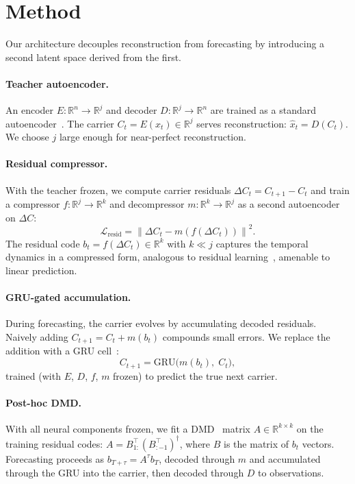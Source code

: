 \documentclass{article}
\begin{document}
\section{Method}
\label{sec:method}

Our architecture decouples reconstruction from forecasting by introducing a
second latent space derived from the first.

\paragraph{Teacher autoencoder.}
An encoder $E: \mathbb{R}^n \to \mathbb{R}^j$ and decoder
$D: \mathbb{R}^j \to \mathbb{R}^n$ are trained as a standard
autoencoder~\citep{hinton2006reducing}.
The carrier $C_t = E(x_t) \in \mathbb{R}^j$ serves reconstruction:
$\hat{x}_t = D(C_t)$.  We choose $j$ large enough for near-perfect
reconstruction.

\paragraph{Residual compressor.}
With the teacher frozen, we compute carrier residuals
$\Delta C_t = C_{t+1} - C_t$ and train a compressor $f: \mathbb{R}^j \to
\mathbb{R}^k$ and decompressor $m: \mathbb{R}^k \to \mathbb{R}^j$ as a
second autoencoder on $\Delta C$:
\begin{equation}
  \mathcal{L}_{\mathrm{resid}} = \left\| \Delta C_t - m(f(\Delta C_t)) \right\|^2.
  \label{eq:resid}
\end{equation}
The residual code $b_t = f(\Delta C_t) \in \mathbb{R}^k$ with $k \ll j$
captures the temporal dynamics in a compressed form, analogous to residual
learning~\citep{he2016deep}, amenable to linear prediction.

\paragraph{GRU-gated accumulation.}
During forecasting, the carrier evolves by accumulating decoded residuals.
Naively adding $C_{t+1} = C_t + m(b_t)$ compounds small errors.
We replace the addition with a GRU cell~\citep{cho2014learning}:
\begin{equation}
  C_{t+1} = \mathrm{GRU}\!\bigl(m(b_t),\; C_t\bigr),
  \label{eq:gru}
\end{equation}
trained (with $E$, $D$, $f$, $m$ frozen) to predict the true next carrier.

\paragraph{Post-hoc DMD.}
With all neural components frozen, we fit a DMD~\citep{schmid2010dmd} matrix
$A \in \mathbb{R}^{k \times k}$ on the training residual codes:
$A = B_{1:}^\top (B_{:-1}^\top)^\dagger$, where $B$ is the matrix of
$b_t$ vectors.  Forecasting proceeds as
$b_{T+\tau} = A^\tau b_T$, decoded through $m$ and accumulated through the GRU
into the carrier, then decoded through $D$ to observations.
\end{document}
